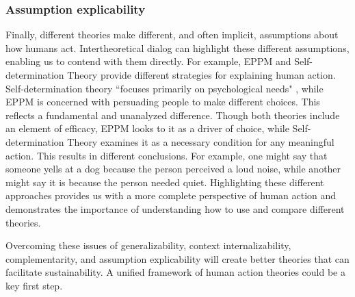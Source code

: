 \documentclass[12 pt]{article}
\begin{document}
\subsubsection{Assumption explicability}
Finally, different theories make different, and often implicit, assumptions about how humans act. Intertheoretical dialog can highlight these different assumptions, enabling us to contend with them directly. For example, EPPM and Self-determination Theory provide different strategies for explaining human action. Self-determination theory ``focuses primarily on psychological needs" \parencite[][p. 57]{Ryan2000}, while EPPM is concerned with persuading people to make different choices. This reflects a fundamental and unanalyzed difference. Though both theories include an element of efficacy, EPPM looks to it as a driver of choice, while Self-determination Theory examines it as a necessary condition for any meaningful action.  This results in different conclusions. For example, one might say that someone yells at a dog because the person perceived a loud noise,  while another might say it is because the person needed quiet. Highlighting these different approaches provides us with a more complete perspective of human action and demonstrates the importance of understanding how to use and compare different theories.

Overcoming these issues of generalizability, context internalizability, complementarity, and assumption explicability will create better theories that can facilitate sustainability. A unified framework of human action theories could be a key first step. 
\end{document}

